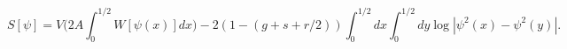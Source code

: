 \begin{equation}
S[\psi ] = V{\Biggr (}2A \int _{0}^{1/2} W[\psi (x)] dx{\Biggl )}
-2(1-(g +s +r/2))\int_{0}^{1/2} dx \int_0^{1/2} dy \log|\psi^2
(x)- \psi^2 (y)|.
\end{equation}

